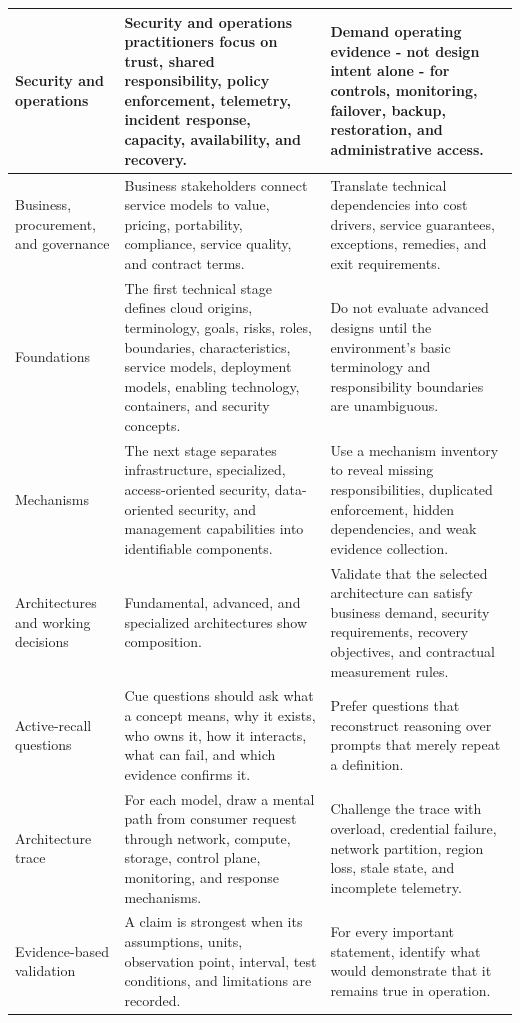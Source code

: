 \documentclass[11pt]{article}
\begin{document}
\begin{longtable}{@{}>{\RaggedRight\arraybackslash}p{}>{\RaggedRight\arraybackslash}p{}>{\RaggedRight\arraybackslash}p{}@{}}
Security and operations & Security and operations practitioners focus on trust, shared responsibility, policy enforcement, telemetry, incident response, capacity, availability, and recovery. & Demand operating evidence - not design intent alone - for controls, monitoring, failover, backup, restoration, and administrative access. \\\midrule
Business, procurement, and governance & Business stakeholders connect service models to value, pricing, portability, compliance, service quality, and contract terms. & Translate technical dependencies into cost drivers, service guarantees, exceptions, remedies, and exit requirements. \\\midrule
Foundations & The first technical stage defines cloud origins, terminology, goals, risks, roles, boundaries, characteristics, service models, deployment models, enabling technology, containers, and security concepts. & Do not evaluate advanced designs until the environment's basic terminology and responsibility boundaries are unambiguous. \\\midrule
Mechanisms & The next stage separates infrastructure, specialized, access-oriented security, data-oriented security, and management capabilities into identifiable components. & Use a mechanism inventory to reveal missing responsibilities, duplicated enforcement, hidden dependencies, and weak evidence collection. \\\midrule
Architectures and working decisions & Fundamental, advanced, and specialized architectures show composition. & Validate that the selected architecture can satisfy business demand, security requirements, recovery objectives, and contractual measurement rules. \\\midrule
Active-recall questions & Cue questions should ask what a concept means, why it exists, who owns it, how it interacts, what can fail, and which evidence confirms it. & Prefer questions that reconstruct reasoning over prompts that merely repeat a definition. \\\midrule
Architecture trace & For each model, draw a mental path from consumer request through network, compute, storage, control plane, monitoring, and response mechanisms. & Challenge the trace with overload, credential failure, network partition, region loss, stale state, and incomplete telemetry. \\\midrule
Evidence-based validation & A claim is strongest when its assumptions, units, observation point, interval, test conditions, and limitations are recorded. & For every important statement, identify what would demonstrate that it remains true in operation. \\\midrule
\bottomrule
\end{longtable}
\endgroup
\end{document}
